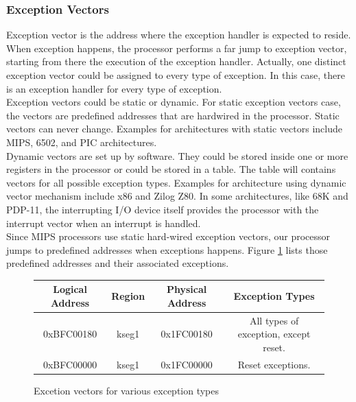 \documentclass[oneside]{book}
\begin{document}
\subsubsection{Exception Vectors}

Exception vector is the address where the exception handler is expected
to reside. When exception happens, the processor performs a far
jump to exception vector, starting from there the execution of
the exception handler. Actually, one distinct exception vector
could be assigned to every type of exception. In this case,
there is an exception handler for every type of exception.\\

Exception vectors could be static or dynamic. For static exception
vectors case, the vectors are predefined addresses that are hardwired
in the processor. Static vectors can never change. Examples
for architectures with static vectors include MIPS, 6502, and PIC
architectures.\\

Dynamic vectors are set up by software. They could be stored inside
one or more registers in the processor or could be stored in a table.
The table will contains vectors for all possible exception types.
Examples for architecture using dynamic vector mechanism include
x86 and Zilog Z80. In some architectures, like 68K and PDP-11,
the interrupting I/O device itself provides the processor
with the interrupt vector when an interrupt is handled.\\

Since MIPS processors use static hard-wired exception vectors, our
processor jumps to predefined addresses when exceptions happens.
Figure \ref{vectors} lists those predefined addresses and their
associated exceptions.

\begin{figure}[H]
\begin{center}
\begin{tabular}{|c|c|c|c|}

\hline \textbf{Logical Address} & \textbf{Region} &
       \textbf{Physical Address} & \textbf{Exception Types} \\

\hline 0xBFC00180  & kseg1 & 0x1FC00180 & All types of exception, except reset. \\

\hline 0xBFC00000  & kseg1 & 0x1FC00000 & Reset exceptions.\\

\hline

\end{tabular}
\end{center}
\caption{Excetion vectors for various exception types}
\label{vectors}
\end{figure}
\end{document}
